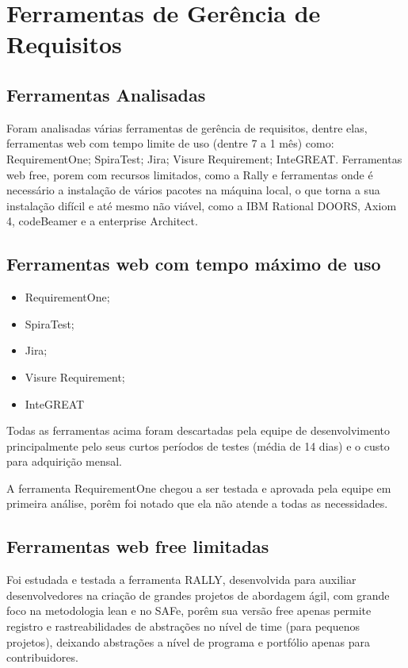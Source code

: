 \section{Ferramentas de Gerência de Requisitos}
	
	\subsection{Ferramentas Analisadas}
	
		Foram analisadas várias ferramentas de gerência de requisitos, dentre elas, ferramentas web com tempo limite de uso (dentre 7 a 1 mês) como: RequirementOne; SpiraTest; Jira; Visure Requirement; InteGREAT. Ferramentas web free, porem com recursos limitados, como a Rally e ferramentas onde é necessário a instalação de vários pacotes na máquina local, o que torna a sua instalação difícil e até mesmo não viável, como a IBM Rational DOORS, Axiom 4, codeBeamer e a enterprise Architect.

	\subsection{Ferramentas web com tempo máximo de uso}
	\begin{itemize}
		\item RequirementOne;
		\item SpiraTest;
		\item Jira;
		\item Visure Requirement;
		\item InteGREAT
	\end{itemize}
		Todas as ferramentas acima foram descartadas pela equipe de desenvolvimento principalmente pelo seus curtos períodos de testes (média de 14 dias) e o custo para adquirição mensal.
		\par A ferramenta RequirementOne chegou a ser testada e aprovada pela equipe em primeira análise, porêm foi notado que ela não atende a todas as necessidades.

	\subsection{Ferramentas web free limitadas}
		Foi estudada e testada a ferramenta RALLY, desenvolvida para auxiliar desenvolvedores na criação de grandes projetos de abordagem ágil, com grande foco na metodologia lean e no SAFe, porêm sua versão free apenas permite registro e rastreabilidades de abstrações no nível de time (para pequenos projetos), deixando abstrações a nível de programa e portfólio apenas para contribuidores.

